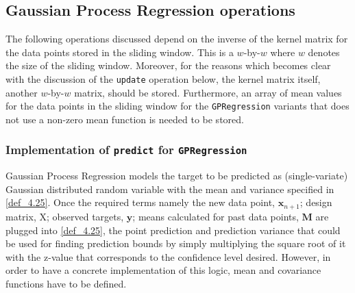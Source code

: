 \subsection{Gaussian Process Regression operations}

The following operations discussed depend on the inverse of the kernel matrix for the data points stored in the sliding window. This is a $w$-by-$w$ where $w$ denotes the size of the sliding window. Moreover, for the reasons which becomes clear with the discussion of the \texttt{update} operation below, the kernel matrix itself, another $w$-by-$w$ matrix, should be stored. Furthermore, an array of mean values for the data points in the sliding window for the \texttt{GPRegression} variants that does not use a non-zero mean function is needed to be stored.

\subsubsection{Implementation of \texttt{predict} for \texttt{GPRegression}}

Gaussian Process Regression models the target to be predicted as (single-variate) Gaussian distributed random variable with the mean and variance specified in \ref{def_4.25}. Once the required terms namely the new data point, $\pmb{x}_{n+1}$; design matrix, X; observed targets, $\pmb{y}$; means calculated for past data points, $\pmb{M}$ are plugged into \ref{def_4.25}, the point prediction and prediction variance that could be used for finding prediction bounds by simply multiplying the square root of it with the z-value that corresponds to the confidence level desired. However, in order to have a concrete implementation of this logic, mean and covariance functions have to be defined. 

